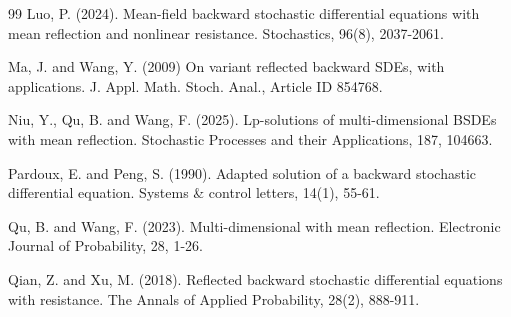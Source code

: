 \documentclass[10pt]{article}%
\numberwithin{equation}{section}
\begin{document}
\begin{thebibliography}{99}
 Luo, P. (2024). Mean-field backward stochastic differential equations with mean reflection and nonlinear resistance. Stochastics, 96(8), 2037-2061.

  Ma, J. and Wang, Y. (2009) On variant reflected backward SDEs, with applications. J. Appl. Math. Stoch. Anal., Article ID 854768. 

 Niu, Y., Qu, B. and Wang, F. (2025). Lp-solutions of multi-dimensional BSDEs with mean reflection. Stochastic Processes and their Applications, 187, 104663.

 Pardoux, E. and Peng, S. (1990). Adapted solution of a backward stochastic differential equation. Systems \& control letters, 14(1), 55-61.








 Qu, B. and Wang, F. (2023). Multi-dimensional  with mean reflection. Electronic Journal of Probability, 28, 1-26.

 Qian, Z. and Xu, M. (2018). Reflected backward stochastic differential equations with resistance. The Annals of Applied Probability, 28(2), 888-911.



\end{thebibliography}
\end{document}
